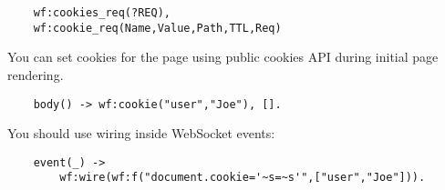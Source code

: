 \begin{lstlisting}
    wf:cookies_req(?REQ),
    wf:cookie_req(Name,Value,Path,TTL,Req)
\end{lstlisting}

You can set cookies for the page using public cookies API during initial page rendering.

\begin{lstlisting}
    body() -> wf:cookie("user","Joe"), [].
\end{lstlisting}

You should use wiring inside WebSocket events:

\begin{lstlisting}
    event(_) ->
        wf:wire(wf:f("document.cookie='~s=~s'",["user","Joe"])).
\end{lstlisting}
